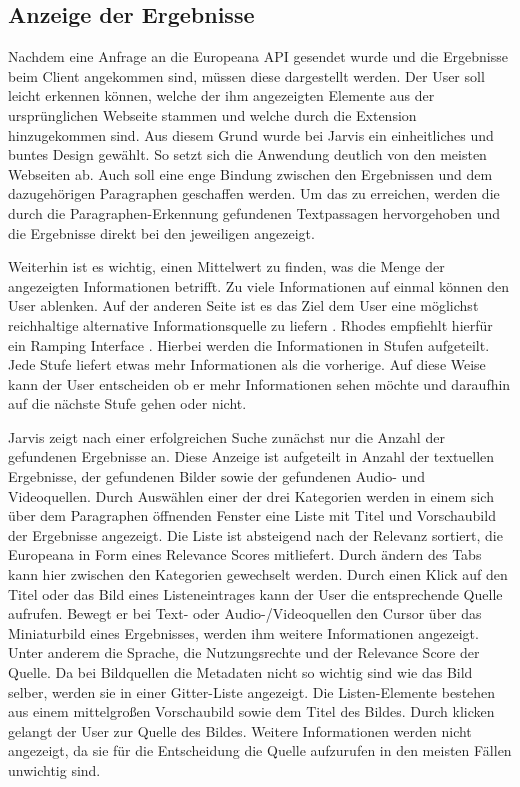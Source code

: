  \subsection{Anzeige der Ergebnisse}
 Nachdem eine Anfrage an die Europeana API gesendet wurde und die Ergebnisse beim Client angekommen sind, müssen diese dargestellt werden. Der User soll leicht erkennen können, welche der ihm angezeigten Elemente aus der ursprünglichen Webseite stammen und welche durch die Extension hinzugekommen sind. Aus diesem Grund wurde bei Jarvis ein einheitliches und buntes Design gewählt. So setzt sich die Anwendung deutlich von den meisten Webseiten ab. Auch soll eine enge Bindung zwischen den Ergebnissen und dem dazugehörigen Paragraphen geschaffen werden. Um das zu erreichen, werden die durch die Paragraphen-Erkennung gefundenen Textpassagen hervorgehoben und die Ergebnisse direkt bei den jeweiligen angezeigt.

 Weiterhin ist es wichtig, einen Mittelwert zu finden, was die Menge der angezeigten Informationen betrifft. Zu viele Informationen auf einmal können den User ablenken. Auf der anderen Seite ist es das Ziel dem User eine möglichst reichhaltige alternative Informationsquelle zu liefern \cite{rhodes2000margin}. Rhodes empfiehlt hierfür ein Ramping Interface \cite{rhodes2000just}. Hierbei werden die Informationen in Stufen aufgeteilt. Jede Stufe liefert etwas mehr Informationen als die vorherige. Auf diese Weise kann der User entscheiden ob er mehr Informationen sehen möchte und daraufhin auf die nächste Stufe gehen oder nicht.

 Jarvis zeigt nach einer erfolgreichen Suche zunächst nur die Anzahl der gefundenen Ergebnisse an. Diese Anzeige ist aufgeteilt in Anzahl der textuellen Ergebnisse, der gefundenen Bilder sowie der gefundenen Audio- und Videoquellen. Durch Auswählen einer der drei Kategorien werden in einem sich über dem Paragraphen öffnenden Fenster eine Liste mit Titel und Vorschaubild der Ergebnisse angezeigt. Die Liste ist absteigend nach der Relevanz sortiert, die Europeana in Form eines Relevance Scores mitliefert. Durch ändern des Tabs kann hier zwischen den Kategorien gewechselt werden.
 Durch einen Klick auf den Titel oder das Bild eines Listeneintrages kann der User die entsprechende Quelle aufrufen. Bewegt er bei Text- oder Audio-/Videoquellen den Cursor über das Miniaturbild eines Ergebnisses, werden ihm weitere Informationen angezeigt. Unter anderem die Sprache, die Nutzungsrechte und der Relevance Score der Quelle. Da bei Bildquellen die Metadaten nicht so wichtig sind wie das Bild selber, werden sie in einer Gitter-Liste angezeigt. Die Listen-Elemente bestehen aus einem mittelgroßen Vorschaubild sowie dem Titel des Bildes. Durch klicken gelangt der User zur Quelle des Bildes. Weitere Informationen werden nicht angezeigt, da sie für die Entscheidung die Quelle aufzurufen in den meisten Fällen unwichtig sind.


